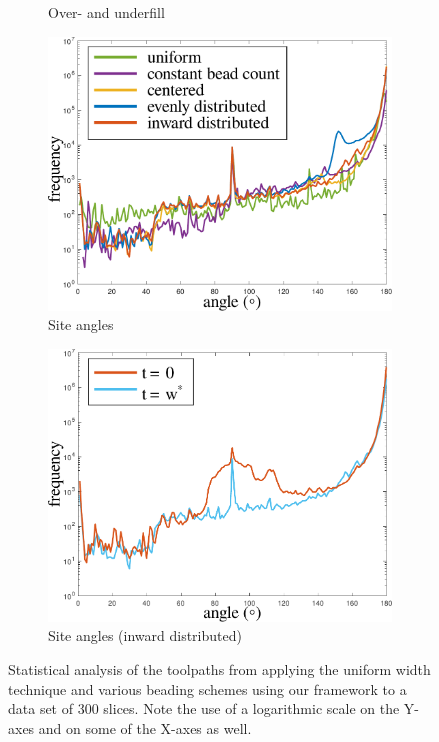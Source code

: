 \begin{figure}
\begin{subfigure}{\figwidth}
\caption{Over- and underfill}
\label{over_underfill}
\end{subfigure}
\begin{subfigure}{\figwidth}\centering
\includegraphics[height=\figheight]{sources-validation-smoothness.pdf}
\caption{Site angles}
\label{smoothness}
\end{subfigure}
\begin{subfigure}{\figwidth}\centering
\includegraphics[height=\figheight]{sources-validation-smoothnessNoTransition.pdf}
\caption{Site angles (inward distributed)}
\label{smoothnessNoTransition}
\end{subfigure}


\caption{
Statistical analysis of the toolpaths from applying the uniform width technique and various beading schemes using our framework to a data set of 300 slices.
Note the use of a logarithmic scale on the Y-axes and on some of the X-axes as well.
}
\end{figure}
